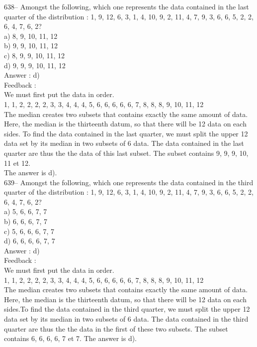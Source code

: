 \documentclass[letterpaper, 12pt]{article}
\begin{document}
638--  Amongst the following, which one represents the data contained in the last quarter of the distribution : 1, 9, 12, 6, 3, 1, 4,
10, 9, 2, 11, 4, 7, 9, 3, 6, 6, 5, 2, 2, 6, 4, 7, 6, 2?\\
a) 8, 9, 10, 11, 12\\
b) 9, 9, 10, 11, 12\\
c) 8, 9, 9, 10, 11, 12\\
d) 9, 9, 9, 10, 11, 12\\

Answer : d)\\

Feedback : \\
We must first put the data in order.\\
1, 1, 2, 2, 2, 2, 3, 3, 4, 4, 4, 5, 6, 6, 6, 6, 6, 7, 8, 8, 8, 9, 10, 11, 12\\
The median creates two subsets that contains exactly the same amount of data. Here, the median is the thirteenth datum, so that there will be 12 data on each sides.
To find the data contained in the last quarter, we must split the upper 12 data set by its median in two subsets of 6 data. The data contained in the last quarter are thus the the data of this last subset. The subset contains  9, 9, 9, 10, 11 et 12.\\
The answer is d). \\

639-- Amongst the following, which one represents the data contained in the third quarter of the distribution : 1, 9, 12, 6, 3, 1, 4,
10, 9, 2, 11, 4, 7, 9, 3, 6, 6, 5, 2, 2, 6, 4, 7, 6, 2?\\
a) 5, 6, 6, 7, 7\\
b) 6, 6, 6, 7, 7\\
c) 5, 6, 6, 6, 7, 7\\
d) 6, 6, 6, 6, 7, 7\\

Answer : d)\\

Feedback : \\
We must first put the data in order.\\
1, 1, 2, 2, 2, 2, 3, 3, 4, 4, 4, 5, 6, 6, 6, 6, 6, 7, 8, 8, 8, 9, 10, 11, 12\\
The median creates two subsets that contains exactly the same amount of data. Here, the median is the thirteenth datum, so that there will be 12 data on each sides.To find the data contained in the third quarter, we must split the upper 12 data set by its median in two subsets of 6 data. The data contained in the third quarter are thus the the data in the first of these two subsets. The subset contains  6, 6, 6, 6, 7 et 7.  
The answer is d). \\
\end{document}
